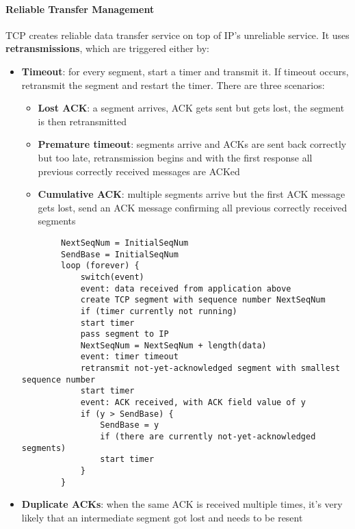 \paragraph{Reliable Transfer Management} TCP creates reliable data transfer service on top of IP’s unreliable service. It uses \textbf{retransmissions}, which are triggered either by:
\begin{itemize}
	\item \textbf{Timeout}: for every segment, start a timer and transmit it. If timeout occurs, retransmit the segment and restart the timer. There are three scenarios:
	\begin{itemize}
		\item \textbf{Lost ACK}: a segment arrives, ACK gets sent but gets lost, the segment is then retransmitted
		\item \textbf{Premature timeout}: segments arrive and ACKs are sent back correctly but too late, retransmission begins and with the first response all previous correctly received messages are ACKed
		\item \textbf{Cumulative ACK}: multiple segments arrive but the first ACK message gets lost, send an ACK message confirming all previous correctly received segments 
	\end{itemize}
	\begin{figure}[!h]
		\centering
	\end{figure}
	\begin{lstlisting}
		NextSeqNum = InitialSeqNum
		SendBase = InitialSeqNum
		loop (forever) {
			switch(event)
			event: data received from application above
			create TCP segment with sequence number NextSeqNum
			if (timer currently not running)
			start timer
			pass segment to IP
			NextSeqNum = NextSeqNum + length(data)
			event: timer timeout
			retransmit not-yet-acknowledged segment with smallest sequence number
			start timer
			event: ACK received, with ACK field value of y
			if (y > SendBase) {
				SendBase = y
				if (there are currently not-yet-acknowledged segments)
				start timer
			}
		}
	\end{lstlisting}
	\item \textbf{Duplicate ACKs}: when the same ACK is received multiple times, it's very likely that an intermediate segment got lost and needs to be resent
\end{itemize}
